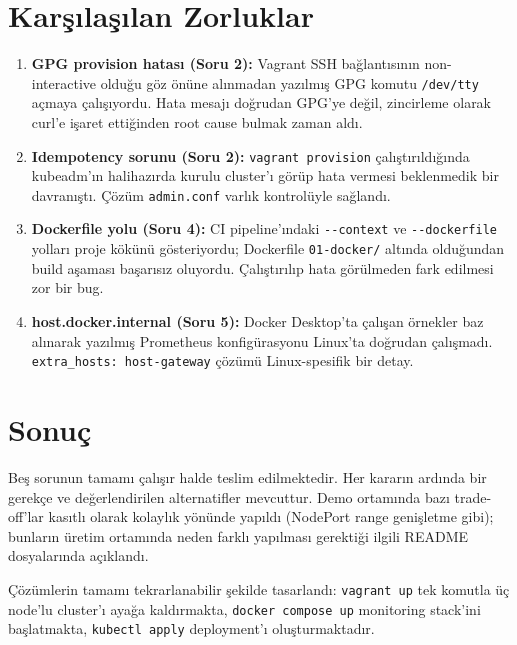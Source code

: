 \documentclass[12pt,a4paper]{article}
\begin{document}
\section{Karşılaşılan Zorluklar}

\begin{enumerate}[leftmargin=*]
  \item \textbf{GPG provision hatası (Soru 2):} Vagrant SSH
        bağlantısının non-interactive olduğu göz önüne alınmadan
        yazılmış GPG komutu \texttt{/dev/tty} açmaya çalışıyordu.
        Hata mesajı doğrudan GPG'ye değil, zincirleme olarak curl'e
        işaret ettiğinden root cause bulmak zaman aldı.

  \item \textbf{Idempotency sorunu (Soru 2):} \texttt{vagrant provision}
        çalıştırıldığında kubeadm'ın halihazırda kurulu cluster'ı
        görüp hata vermesi beklenmedik bir davranıştı. Çözüm
        \texttt{admin.conf} varlık kontrolüyle sağlandı.

  \item \textbf{Dockerfile yolu (Soru 4):} CI pipeline'ındaki
        \texttt{-{}-context} ve \texttt{-{}-dockerfile} yolları proje
        kökünü gösteriyordu; Dockerfile \texttt{01-docker/} altında
        olduğundan build aşaması başarısız oluyordu. Çalıştırılıp
        hata görülmeden fark edilmesi zor bir bug.

  \item \textbf{host.docker.internal (Soru 5):} Docker Desktop'ta
        çalışan örnekler baz alınarak yazılmış Prometheus konfigürasyonu
        Linux'ta doğrudan çalışmadı. \texttt{extra\_hosts:
        host-gateway} çözümü Linux-spesifik bir detay.
\end{enumerate}

\section{Sonuç}

Beş sorunun tamamı çalışır halde teslim edilmektedir. Her kararın
ardında bir gerekçe ve değerlendirilen alternatifler mevcuttur.
Demo ortamında bazı trade-off'lar kasıtlı olarak kolaylık yönünde
yapıldı (NodePort range genişletme gibi); bunların üretim ortamında
neden farklı yapılması gerektiği ilgili README dosyalarında açıklandı.

Çözümlerin tamamı tekrarlanabilir şekilde tasarlandı: \texttt{vagrant up}
tek komutla üç node'lu cluster'ı ayağa kaldırmakta,
\texttt{docker compose up} monitoring stack'ini başlatmakta,
\texttt{kubectl apply} deployment'ı oluşturmaktadır.
\end{document}
